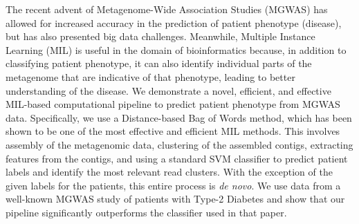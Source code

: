 
The recent advent of Metagenome-Wide Association Studies (MGWAS) has allowed for increased accuracy in the prediction of patient phenotype (disease), but has also presented big data challenges. Meanwhile, Multiple Instance Learning (MIL) is useful in the domain of bioinformatics because, in addition to classifying patient phenotype, it can also identify individual parts of the metagenome that are indicative of that phenotype, leading to better understanding of the disease. We demonstrate a novel, efficient, and effective MIL-based computational pipeline to predict patient phenotype from MGWAS data. Specifically, we use a Distance-based Bag of Words method, which has been shown to be one of the most effective and efficient MIL methods. This involves assembly of the metagenomic data, clustering of the assembled contigs, extracting features from the contigs, and using a standard SVM classifier to predict patient labels and identify the most relevant read clusters. With the exception of the given labels for the patients, this entire process is \emph{de novo}. We use data from a well-known MGWAS study of patients with Type-2 Diabetes and show that our pipeline significantly outperforms the classifier used in that paper.
